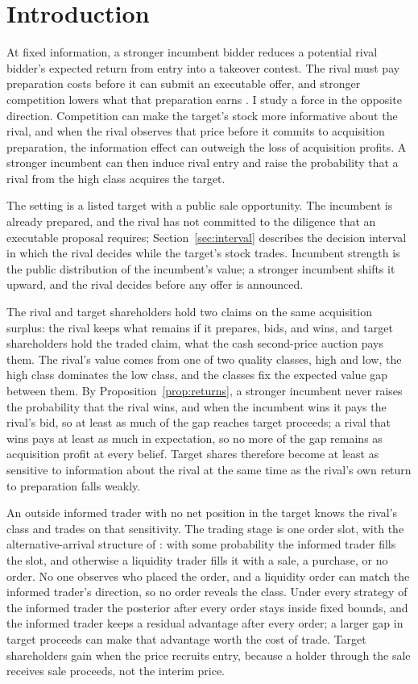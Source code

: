 \section{Introduction}\label{sec:intro}

At fixed information, a stronger incumbent bidder reduces a potential rival bidder's expected return from entry
into a takeover contest. The rival must pay preparation costs before it can submit an executable offer, and
stronger competition lowers what that preparation earns \citep{Fishman1988,HirshleiferPng1989}. I study a force
in the opposite direction. Competition can make the target's stock more informative about the rival, and when the
rival observes that price before it commits to acquisition preparation, the information effect can outweigh the
loss of acquisition profits. A stronger incumbent can then induce rival entry and raise the probability that a
rival from the high class acquires the target.

The setting is a listed target with a public sale opportunity. The incumbent is already prepared, and the rival
has not committed to the diligence that an executable proposal requires; Section~\ref{sec:interval} describes the
decision interval in which the rival decides while the target's stock trades. Incumbent strength is the public
distribution of the incumbent's value; a stronger incumbent shifts it upward, and the rival decides
before any offer is announced.

The rival and target shareholders hold two claims on the same acquisition surplus: the rival keeps
what remains if it prepares, bids, and wins, and target shareholders hold the traded claim, what the cash
second-price auction pays them. The rival's value comes from one of two quality classes, high and low, the
high class dominates the low class, and the classes fix the expected value gap between them. By
Proposition~\ref{prop:returns}, a stronger incumbent never raises the probability that the
rival wins, and when the incumbent wins it pays the rival's bid, so at least as much of the gap reaches
target proceeds; a rival that wins pays at least as much in expectation, so no more of the gap remains as
acquisition profit at every belief. Target shares therefore become at least as sensitive to information about the
rival at the same time as the rival's own return to preparation falls weakly.

An outside informed trader with no net position in the target knows the rival's class and trades on that
sensitivity. The trading stage is one order slot, with the alternative-arrival structure of
\citet{DowGorton1997}: with some probability the informed trader fills the slot, and otherwise a liquidity trader fills
it with a sale, a purchase, or no order. No one observes who placed the order, and a liquidity order can match
the informed trader's direction, so no order reveals the class. Under every strategy of the informed trader the posterior after every
order stays inside fixed bounds, and the informed trader keeps a residual advantage after every order; a larger gap in
target proceeds can make that advantage worth the cost of trade. Target shareholders gain when the price recruits
entry, because a holder through the sale receives sale proceeds, not the interim price.

